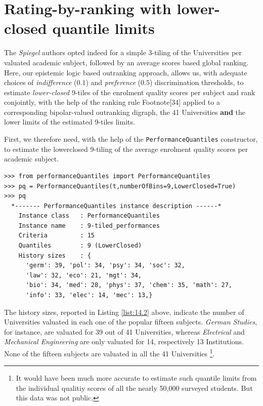 \section{Rating-by-ranking with lower-closed quantile limits}
\label{sec:14.1}

The \emph{Spiegel} authors opted indeed for a simple 3-tiling of the Universities per valuated academic subject, followed by an average \Borda scores based global ranking. Here, our epistemic logic based outranking approach, allows us, with adequate choices of \emph{indifference} ($0.1$) and \emph{preference} ($0.5$) discrimination thresholds, to estimate \emph{lower-closed} 9-tiles of the enrolment quality scores per subject and rank conjointly, with the help of the \Copeland ranking rule Footnote[34] applied to a corresponding bipolar-valued outranking digraph, the 41 Universities \textbf{and} the lower limits of the estimated 9-tiles limits.

First, we therefore need, with the help of the \texttt{PerformanceQuantiles} constructor, to estimate the lowerclosed 9-tiling of the average enrolment quality scores per academic subject.

\begin{lstlisting}[caption={Computing 9-tiles of the enrolment quality scores per subject},label=list:14.2]
>>> from performanceQuantiles import PerformanceQuantiles
>>> pq = PerformanceQuantiles(t,numberOfBins=9,LowerClosed=True)
>>> pq
  *------- PerformanceQuantiles instance description ------*
    Instance class   : PerformanceQuantiles
    Instance name    : 9-tiled_performances
    Criteria         : 15
    Quantiles        : 9 (LowerClosed)
    History sizes    : {
      'germ': 39, 'pol': 34, 'psy': 34, 'soc': 32,
      'law': 32, 'eco': 21, 'mgt': 34,
      'bio': 34, 'med': 28, 'phys': 37, 'chem': 35, 'math': 27,
      'info': 33, 'elec': 14, 'mec': 13,}
\end{lstlisting}

The history sizes, reported in Listing \ref{list:14.2} above, indicate the number of Universities valuated in each one of the popular fifteen subjects. \emph{German Studies}, for instance, are valuated for 39 out of 41 Universities, whereas \emph{Electrical} and \emph{Mechanical Engineering} are only valuated for 14, respectively 13 Institutions. None of the fifteen subjects are valuated in all the 41 Universities \footnote{It would have been much more accurate to estimate such quantile limits from the individual qualitiy scores of all the nearly 50,000 surveyed students. But this data was not public.}. 

